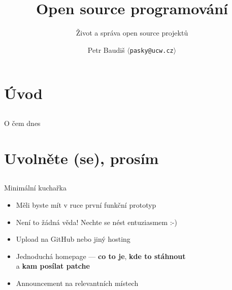\documentclass{beamer}
\begin{document}

\title{Open source programování}
\subtitle{Život a správa open source projektů}
\author{Petr Baudiš $\langle${\tt pasky@ucw.cz}$\rangle$}
\date{}
\frame{\titlepage}

\section{Úvod}

\subsection{}
\begin{frame}{O čem dnes}
\end{frame}


\section{Uvolněte (se), prosím}

\subsection{}
\begin{frame}{Minimální kuchařka}
\begin{itemize}
\item Měli byste mít v ruce první funkční prototyp
\item Není to žádná věda! Nechte se nést entuziasmem :-)
\item Upload na GitHub nebo jiný hosting
\item Jednoduchá homepage --- {\bf co to je}, {\bf kde to stáhnout} \\ a {\bf kam posílat patche}
\item Announcement na relevantních místech
\end{itemize}
\end{frame}
\end{document}
